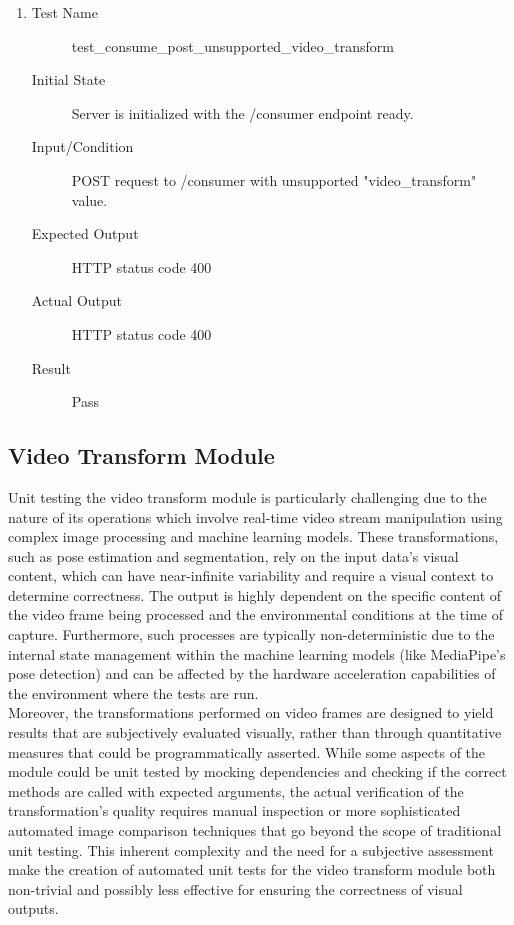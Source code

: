 \documentclass[12pt, titlepage]{article}
\begin{document}
\begin{enumerate}[UT-S1]
    \item \label{UT-S12}
    \begin{description}
    \item[Test Name] test\_consume\_post\_unsupported\_video\_transform
    \item[Initial State] Server is initialized with the /consumer endpoint ready.
    \item[Input/Condition] POST request to /consumer with unsupported "video\_transform" value.
    \item[Expected Output] HTTP status code 400
    \item[Actual Output] HTTP status code 400
    \item[Result] Pass
    \end{description}
\end{enumerate}

\subsection{Video Transform Module}
Unit testing the video transform module is particularly challenging due to the nature of its operations which involve real-time video stream manipulation using complex image processing and machine learning models. 
These transformations, such as pose estimation and segmentation, rely on the input data's visual content, which can have near-infinite variability and require a visual context to determine correctness. 
The output is highly dependent on the specific content of the video frame being processed and the environmental conditions at the time of capture. Furthermore, such processes are typically non-deterministic due to the internal state management within the machine learning models (like MediaPipe's pose detection) and can be affected by the hardware acceleration capabilities of the environment where the tests are run. \\
Moreover, the transformations performed on video frames are designed to yield results that are subjectively evaluated visually, rather than through quantitative measures that could be programmatically asserted. 
While some aspects of the module could be unit tested by mocking dependencies and checking if the correct methods are called with expected arguments, the actual verification of the transformation's quality requires manual inspection or more sophisticated automated image comparison techniques that go beyond the scope of traditional unit testing. 
This inherent complexity and the need for a subjective assessment make the creation of automated unit tests for the video transform module both non-trivial and possibly less effective for ensuring the correctness of visual outputs.
\end{document}
